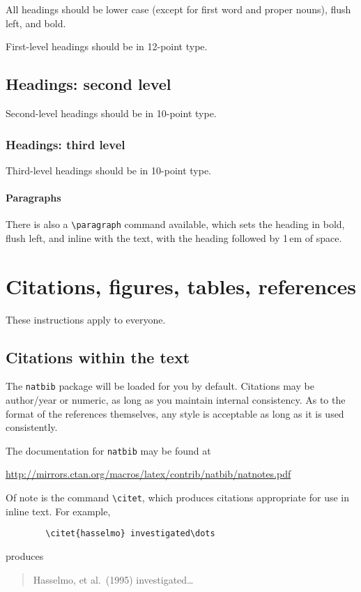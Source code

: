 \documentclass{article}
\begin{document}
	All headings should be lower case (except for first word and proper nouns),
	flush left, and bold.
	
	First-level headings should be in 12-point type.
	
	\subsection{Headings: second level}
	
	Second-level headings should be in 10-point type.
	
	\subsubsection{Headings: third level}
	
	Third-level headings should be in 10-point type.
	
	\paragraph{Paragraphs}
	
	There is also a \verb+\paragraph+ command available, which sets the heading in
	bold, flush left, and inline with the text, with the heading followed by 1\,em
	of space.
	
	\section{Citations, figures, tables, references}
	\label{others}
	
	These instructions apply to everyone.
	
	\subsection{Citations within the text}
	
	The \verb+natbib+ package will be loaded for you by default.  Citations may be
	author/year or numeric, as long as you maintain internal consistency.  As to the
	format of the references themselves, any style is acceptable as long as it is
	used consistently.
	
	The documentation for \verb+natbib+ may be found at
	\begin{center}
		\url{http://mirrors.ctan.org/macros/latex/contrib/natbib/natnotes.pdf}
	\end{center}
	Of note is the command \verb+\citet+, which produces citations appropriate for
	use in inline text.  For example,
	\begin{verbatim}
		\citet{hasselmo} investigated\dots
	\end{verbatim}
	produces
	\begin{quote}
		Hasselmo, et al.\ (1995) investigated\dots
	\end{quote}
	
\end{document}

